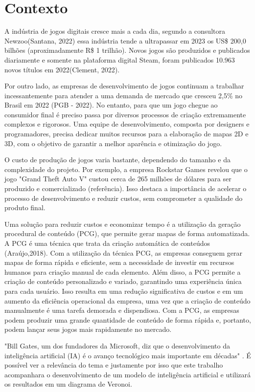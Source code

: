 \documentclass[
	12pt,				%
	openright,			%
	twoside,			%
	a4paper,			%
	english,			%
	french,				%
	spanish,			%
	brazil				%
	]{abntex2}
\begin{document}
\section{Contexto}

A indústria de jogos digitais cresce mais a cada dia, segundo a consultora Newzoo(Santana, 2022) essa indústria tende a ultrapassar em 2023 os US\$ 200,0 bilhões (aproximadamente R\$ 1 trilhão). Novos jogos são produzidos e publicados diariamente e somente na plataforma digital Steam, foram publicados 10.963 novos títulos em 2022(Clement, 2022).

Por outro lado, as empresas de desenvolvimento de jogos continuam a trabalhar incessantemente para atender a uma demanda de mercado que cresceu 2,5\% no Brasil em 2022 
(PGB - 2022). No entanto, para que um jogo chegue ao consumidor final é preciso passa por diversos processos de criação extremamente complexos e rigorosos. Uma equipe de desenvolvimento, composta por designers e programadores, precisa dedicar muitos recursos para a elaboração de mapas 2D e 3D, com o objetivo de garantir a melhor aparência e otimização do jogo.

O custo de produção de jogos varia bastante, dependendo do tamanho e da complexidade do projeto. Por exemplo, a empresa Rockstar Games revelou que o jogo "Grand Theft Auto V" custou cerca de 265 milhões de dólares para ser produzido e comercializado (referência). Isso destaca a importância de acelerar o processo de desenvolvimento e reduzir custos, sem comprometer a qualidade do produto final.

Uma solução para reduzir custos e economizar tempo é a utilização da geração procedural de conteúdo (PCG), que permite gerar mapas de forma automatizada. A PCG é uma técnica que trata da criação automática de conteúdos (Araújo,2018). Com a utilização da técnica PCG, as empresas conseguem gerar mapas de forma rápida e eficiente, sem a necessidade de investir em recursos humanos para criação manual de cada elemento. Além disso, a PCG permite a criação de conteúdo personalizado e variado, garantindo uma experiência única para cada usuário. Isso resulta em uma redução significativa de custos e em um aumento da eficiência operacional da empresa, uma vez que a criação de conteúdo manualmente é uma tarefa demorada e dispendiosa. Com a PCG, as empresas podem produzir uma grande quantidade de conteúdo de forma rápida e, portanto, podem lançar seus jogos mais rapidamente no mercado.

"Bill Gates, um dos fundadores da Microsoft, diz que o desenvolvimento da inteligência artificial (IA) é o avanço tecnológico mais importante em décadas"\space
\cite{inteligencia_artificial_e_avanco_bbc}. É possível ver
a relevância do tema e justamente por isso que este trabalho acompanhara o desenvolvimento
de um modelo de inteligência artificial e utilizará os resultados em um diagrama de Veronoi.
\end{document}
